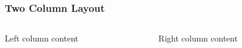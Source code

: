 \begin{frame}
\frametitle{Two Column Layout}
\begin{columns}[T]
    \begin{column}{0.48\textwidth}
        Left column content
    \end{column}
    \begin{column}{0.48\textwidth}
        Right column content
    \end{column}
\end{columns}
\end{frame}